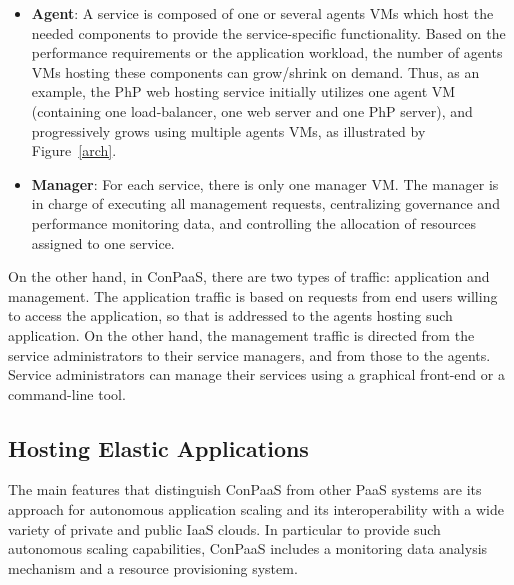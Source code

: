 \begin{itemize}
\item \textbf{Agent}: A service is composed of one or several agents VMs which host the needed components to provide the service-specific functionality. Based on the performance requirements or the application workload, the number of agents VMs hosting these components can grow/shrink on demand. Thus, as an example, the PhP web hosting service initially utilizes one agent VM (containing one load-balancer, one web server and one PhP server), and progressively grows using multiple agents VMs, as illustrated by Figure~\ref{arch}. 

\item \textbf{Manager}: For each service, there is only one manager VM. The manager is in charge of executing all management requests, centralizing governance and performance monitoring data, and controlling the allocation of resources assigned to one service. 

\end{itemize}

On the other hand, in ConPaaS, there are two types of traffic: application and management. The application traffic is based on requests from end users willing to access the application, so that is addressed to the agents hosting such application.  On the other hand, the management traffic is directed from the service administrators to their service managers, and from those to the agents.  Service administrators can manage their services using a graphical front-end or a command-line tool.  

\subsection{Hosting Elastic Applications}

The main features that distinguish ConPaaS from other PaaS systems are its approach for autonomous application scaling and its interoperability with a wide variety of private and public IaaS clouds. In particular to provide such autonomous scaling capabilities, ConPaaS includes a monitoring data analysis mechanism  and a resource provisioning system.

